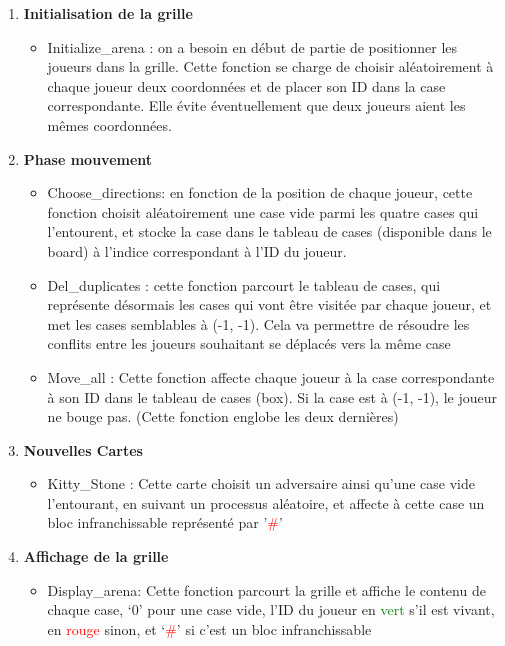 \documentclass[a4paper]{article}
\begin{document}
\begin{enumerate}
\item \textbf{Initialisation de la grille} \\
\begin{itemize}
\item Initialize\_arena : on a besoin en début de partie de positionner les joueurs dans la grille. Cette fonction se charge de choisir aléatoirement à chaque joueur deux coordonnées et de placer son ID dans la case correspondante. Elle évite éventuellement que deux joueurs aient les mêmes coordonnées.\\
\end{itemize} 
\item \textbf{Phase mouvement} \\
\begin{itemize}
\item Choose\_directions: en fonction de la position de chaque joueur, cette fonction choisit aléatoirement une case vide parmi les quatre cases qui l’entourent, et stocke la case dans le tableau de cases (disponible dans le board) à l’indice correspondant à l’ID du joueur. \\
\item Del\_duplicates : cette fonction parcourt le tableau de cases, qui représente désormais les cases qui vont être visitée par chaque joueur, et met les cases semblables à (-1, -1). Cela va permettre de résoudre les conflits entre les joueurs souhaitant se déplacés vers la même case \\
\item Move\_all : Cette fonction affecte chaque joueur à la case correspondante à son ID dans le tableau de cases (box). Si la case est à (-1, -1), le joueur ne bouge pas. (Cette fonction englobe les deux dernières)\\
\end{itemize}

\item \textbf{Nouvelles Cartes}\\
\begin{itemize}
\item Kitty\_Stone : Cette carte choisit un adversaire ainsi qu’une case vide l’entourant, en suivant un processus aléatoire, et affecte à cette case un bloc infranchissable représenté par '\textcolor{red}{\#}'\\

\end{itemize}

\item \textbf{Affichage de la grille}\\
\begin{itemize}
\item Display\_arena: Cette fonction parcourt la grille et affiche le contenu de chaque case, ‘0’ pour une case vide, l’ID du joueur en \textcolor{green}{vert} s’il est vivant, en \textcolor{red}{rouge} sinon, et ‘\textcolor{red}{\#}’ si c’est un bloc infranchissable\\


\end{itemize}
\end{enumerate}
\end{document}
